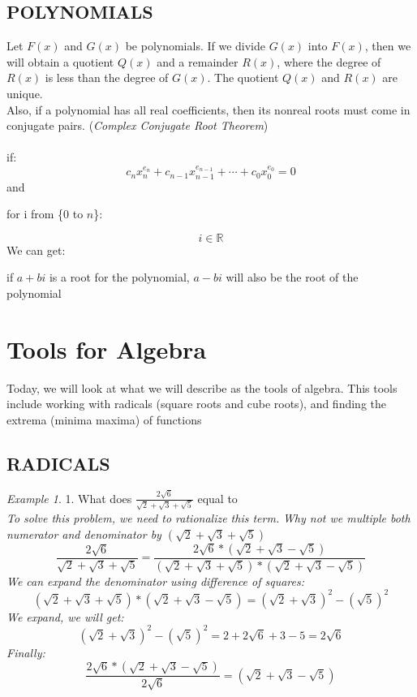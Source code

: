 \documentclass[10pt]{article}
\theoremstyle{remark}
\newtheorem*{example}{Example}
\newcommand{\R}{\mathbb{R}}
\begin{document}
\subsection{POLYNOMIALS}
Let $F(x)$ and $G(x)$ be polynomials. If we divide $G(x)$ into $F(x)$, then we will obtain a quotient $Q(x)$
and a remainder $R(x)$, where the degree of $R(x)$ is less than the degree of $G(x)$. The quotient $Q(x)$ and 
$R(x)$ are unique. \\

Also, if a polynomial has all real coefficients, then its nonreal roots must come in conjugate pairs. (\textit{Complex Conjugate Root Theorem})
\\
\\
if:
\[
	c_nx_n^{e_n} + c_{n - 1}x_{n - 1}^{e_{n - 1}} + \cdots + c_0x_0^{e_0} = 0
\]
and
\begin{center}
	for i from \{0 to $n$\}:
\end{center}
\[
	i \in \R
\]
We can get:
\begin{center}
	if $a + bi$ is a root for the polynomial, $a - bi$ will also be the root of the polynomial
\end{center}

\newpage
\section{Tools for Algebra}
Today, we will look at what we will describe as the tools of algebra. This tools include working with radicals (square roots and cube roots), and finding the extrema (minima 
maxima) of functions\\

\subsection{RADICALS}
\begin{example}
	1. What does $\frac{2\sqrt{6}}{\sqrt{2} + \sqrt{3} + \sqrt{5}}$ equal to\\
	\textit{To solve this problem, we need to rationalize this term.}
	\textit{Why not we multiple both numerator and denominator by $(\sqrt{2} + \sqrt{3} + \sqrt{5})$}
	\[
		\frac{2\sqrt{6}}{\sqrt{2} + \sqrt{3} + \sqrt{5}} = \frac{2\sqrt{6} * (\sqrt{2} + \sqrt{3} - \sqrt{5})}{(\sqrt{2} + \sqrt{3} + \sqrt{5})
		* (\sqrt{2} + \sqrt{3} - \sqrt{5})}
	\]
	\textit{We can expand the denominator using difference of squares:}\\
	\[
		(\sqrt{2} + \sqrt{3} + \sqrt{5}) * (\sqrt{2} + \sqrt{3} - \sqrt{5}) = (\sqrt{2} + \sqrt{3}) ^ 2 - (\sqrt{5})^2
	\]
	\textit{We expand, we will get:}
	\[
		(\sqrt{2} + \sqrt{3}) ^ 2 - (\sqrt{5})^2 = 2 + 2\sqrt{6} + 3 - 5 = 2\sqrt{6}
	\]
	\textit{Finally:}
	\[
		\frac{2\sqrt{6} * (\sqrt{2} + \sqrt{3} - \sqrt{5})}{2\sqrt{6}} = (\sqrt{2} + \sqrt{3} - \sqrt{5})
	\]\\
\end{example}
\end{document}
